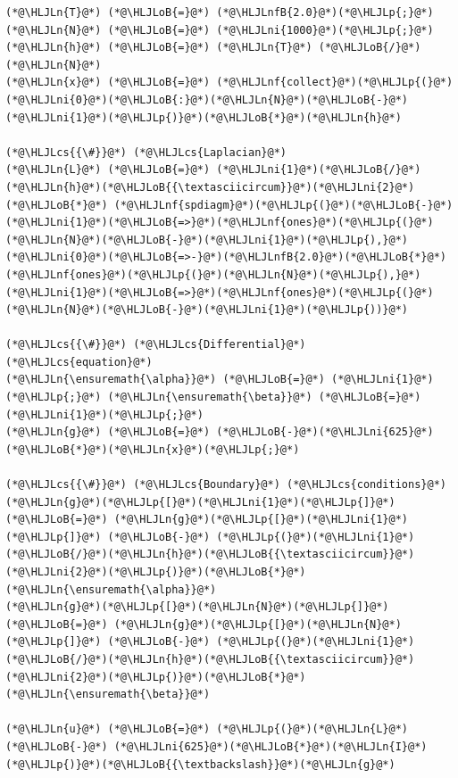\documentclass[12pt,a4paper]{article}
\newcommand{\HLJLn}[1]{#1}
\newcommand{\HLJLnf}[1]{\textcolor[RGB]{66,102,213}{#1}}
\newcommand{\HLJLnfB}[1]{\textcolor[RGB]{59,151,46}{#1}}
\newcommand{\HLJLni}[1]{\textcolor[RGB]{59,151,46}{#1}}
\newcommand{\HLJLoB}[1]{\textcolor[RGB]{102,102,102}{\textbf{#1}}}
\newcommand{\HLJLp}[1]{#1}
\newcommand{\HLJLcs}[1]{\textcolor[RGB]{153,153,119}{\textit{#1}}}
\begin{document}
\begin{lstlisting}
(*@\HLJLn{T}@*) (*@\HLJLoB{=}@*) (*@\HLJLnfB{2.0}@*)(*@\HLJLp{;}@*) (*@\HLJLn{N}@*) (*@\HLJLoB{=}@*) (*@\HLJLni{1000}@*)(*@\HLJLp{;}@*) (*@\HLJLn{h}@*) (*@\HLJLoB{=}@*) (*@\HLJLn{T}@*) (*@\HLJLoB{/}@*) (*@\HLJLn{N}@*)
(*@\HLJLn{x}@*) (*@\HLJLoB{=}@*) (*@\HLJLnf{collect}@*)(*@\HLJLp{(}@*)(*@\HLJLni{0}@*)(*@\HLJLoB{:}@*)(*@\HLJLn{N}@*)(*@\HLJLoB{-}@*)(*@\HLJLni{1}@*)(*@\HLJLp{)}@*)(*@\HLJLoB{*}@*)(*@\HLJLn{h}@*)

(*@\HLJLcs{{\#}}@*) (*@\HLJLcs{Laplacian}@*)
(*@\HLJLn{L}@*) (*@\HLJLoB{=}@*) (*@\HLJLni{1}@*)(*@\HLJLoB{/}@*)(*@\HLJLn{h}@*)(*@\HLJLoB{{\textasciicircum}}@*)(*@\HLJLni{2}@*) (*@\HLJLoB{*}@*) (*@\HLJLnf{spdiagm}@*)(*@\HLJLp{(}@*)(*@\HLJLoB{-}@*)(*@\HLJLni{1}@*)(*@\HLJLoB{=>}@*)(*@\HLJLnf{ones}@*)(*@\HLJLp{(}@*)(*@\HLJLn{N}@*)(*@\HLJLoB{-}@*)(*@\HLJLni{1}@*)(*@\HLJLp{),}@*)(*@\HLJLni{0}@*)(*@\HLJLoB{=>-}@*)(*@\HLJLnfB{2.0}@*)(*@\HLJLoB{*}@*)(*@\HLJLnf{ones}@*)(*@\HLJLp{(}@*)(*@\HLJLn{N}@*)(*@\HLJLp{),}@*)(*@\HLJLni{1}@*)(*@\HLJLoB{=>}@*)(*@\HLJLnf{ones}@*)(*@\HLJLp{(}@*)(*@\HLJLn{N}@*)(*@\HLJLoB{-}@*)(*@\HLJLni{1}@*)(*@\HLJLp{))}@*)

(*@\HLJLcs{{\#}}@*) (*@\HLJLcs{Differential}@*) (*@\HLJLcs{equation}@*)
(*@\HLJLn{\ensuremath{\alpha}}@*) (*@\HLJLoB{=}@*) (*@\HLJLni{1}@*)(*@\HLJLp{;}@*) (*@\HLJLn{\ensuremath{\beta}}@*) (*@\HLJLoB{=}@*) (*@\HLJLni{1}@*)(*@\HLJLp{;}@*)
(*@\HLJLn{g}@*) (*@\HLJLoB{=}@*) (*@\HLJLoB{-}@*)(*@\HLJLni{625}@*)(*@\HLJLoB{*}@*)(*@\HLJLn{x}@*)(*@\HLJLp{;}@*)

(*@\HLJLcs{{\#}}@*) (*@\HLJLcs{Boundary}@*) (*@\HLJLcs{conditions}@*)
(*@\HLJLn{g}@*)(*@\HLJLp{[}@*)(*@\HLJLni{1}@*)(*@\HLJLp{]}@*) (*@\HLJLoB{=}@*) (*@\HLJLn{g}@*)(*@\HLJLp{[}@*)(*@\HLJLni{1}@*)(*@\HLJLp{]}@*) (*@\HLJLoB{-}@*) (*@\HLJLp{(}@*)(*@\HLJLni{1}@*)(*@\HLJLoB{/}@*)(*@\HLJLn{h}@*)(*@\HLJLoB{{\textasciicircum}}@*)(*@\HLJLni{2}@*)(*@\HLJLp{)}@*)(*@\HLJLoB{*}@*)(*@\HLJLn{\ensuremath{\alpha}}@*)
(*@\HLJLn{g}@*)(*@\HLJLp{[}@*)(*@\HLJLn{N}@*)(*@\HLJLp{]}@*) (*@\HLJLoB{=}@*) (*@\HLJLn{g}@*)(*@\HLJLp{[}@*)(*@\HLJLn{N}@*)(*@\HLJLp{]}@*) (*@\HLJLoB{-}@*) (*@\HLJLp{(}@*)(*@\HLJLni{1}@*)(*@\HLJLoB{/}@*)(*@\HLJLn{h}@*)(*@\HLJLoB{{\textasciicircum}}@*)(*@\HLJLni{2}@*)(*@\HLJLp{)}@*)(*@\HLJLoB{*}@*)(*@\HLJLn{\ensuremath{\beta}}@*)

(*@\HLJLn{u}@*) (*@\HLJLoB{=}@*) (*@\HLJLp{(}@*)(*@\HLJLn{L}@*) (*@\HLJLoB{-}@*) (*@\HLJLni{625}@*)(*@\HLJLoB{*}@*)(*@\HLJLn{I}@*)(*@\HLJLp{)}@*)(*@\HLJLoB{{\textbackslash}}@*)(*@\HLJLn{g}@*)


\end{lstlisting}
\end{document}
